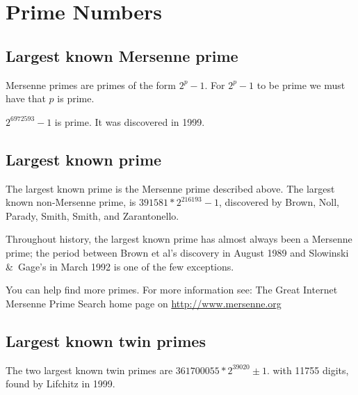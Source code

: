 \section{Prime Numbers}

\subsection{Largest known Mersenne prime}

Mersenne primes are primes of the form $2^p-1$. For $2^p-1$ to be prime
we must have that $p$ is prime.

$2^{6972593}-1$ is prime. It was discovered in 1999.

\subsection{Largest known prime}

The largest known prime is the Mersenne prime described above.  The
largest known non-Mersenne prime, is $391581*2^{216193}-1$, discovered
by Brown, Noll, Parady, Smith, Smith, and Zarantonello.

Throughout history, the largest known prime has almost always been a
Mersenne prime; the period between Brown et al's discovery in August
1989 and Slowinski \&\ Gage's in March 1992 is one of the few
exceptions.

You can help find more primes. For more information see: The Great
Internet Mersenne Prime Search home page on
\url{http://www.mersenne.org}

\Ref


\subsection{Largest known twin primes}


The two largest known twin primes are $361700055 * 2^39020 \pm 1$.  with
11755 digits, found by Lifchitz in 1999.

